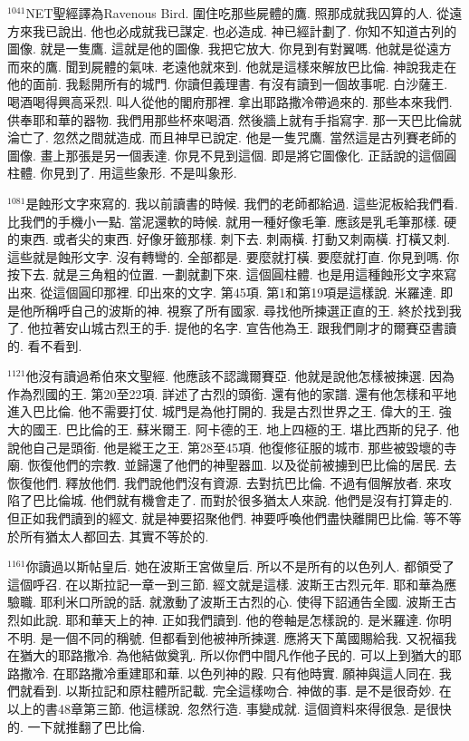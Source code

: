 \documentclass{book}
\begin{document}
$^{1041}$NET聖經譯為Ravenous Bird.
圍住吃那些屍體的鷹.
照那成就我囚算的人.
從遠方來我已說出.
他也必成就我已謀定.
也必造成.
神已經計劃了.
你知不知道古列的圖像.
就是一隻鷹.
這就是他的圖像.
我把它放大.
你見到有對翼嗎.
他就是從遠方而來的鷹.
聞到屍體的氣味.
老遠他就來到.
他就是這樣來解放巴比倫.
神說我走在他的面前.
我鬆開所有的城門.
你讀但義理書.
有沒有讀到一個故事呢.
白沙薩王.
喝酒喝得興高采烈.
叫人從他的閣府那裡.
拿出耶路撒冷帶過來的.
那些本來我們.
供奉耶和華的器物.
我們用那些杯來喝酒.
然後牆上就有手指寫字.
那一天巴比倫就淪亡了.
忽然之間就造成.
而且神早已說定.
他是一隻咒鷹.
當然這是古列賽老師的圖像.
畫上那張是另一個表達.
你見不見到這個.
即是將它圖像化.
正話說的這個圓柱體.
你見到了.
用這些象形.
不是叫象形.

$^{1081}$是蝕形文字來寫的.
我以前讀書的時候.
我們的老師都給過.
這些泥板給我們看.
比我們的手機小一點.
當泥還軟的時候.
就用一種好像毛筆.
應該是乳毛筆那樣.
硬的東西.
或者尖的東西.
好像牙籤那樣.
刺下去.
刺兩橫.
打動又刺兩橫.
打橫又刺.
這些就是蝕形文字.
沒有轉彎的.
全部都是.
要麼就打橫.
要麼就打直.
你見到嗎.
你按下去.
就是三角粗的位置.
一劃就劃下來.
這個圓柱體.
也是用這種蝕形文字來寫出來.
從這個圓印那裡.
印出來的文字.
第45項.
第1和第19項是這樣說.
米羅達.
即是他所稱呼自己的波斯的神.
視察了所有國家.
尋找他所揀選正直的王.
終於找到我了.
他拉著安山城古烈王的手.
提他的名字.
宣告他為王.
跟我們剛才的爾賽亞書讀的.
看不看到.

$^{1121}$他沒有讀過希伯來文聖經.
他應該不認識爾賽亞.
他就是說他怎樣被揀選.
因為作為烈國的王.
第20至22項.
詳述了古烈的頭銜.
還有他的家譜.
還有他怎樣和平地進入巴比倫.
他不需要打仗.
城門是為他打開的.
我是古烈世界之王.
偉大的王.
強大的國王.
巴比倫的王.
蘇米爾王.
阿卡德的王.
地上四極的王.
堪比西斯的兒子.
他說他自己是頭銜.
他是縱王之王.
第28至45項.
他復修征服的城市.
那些被毀壞的寺廟.
恢復他們的宗教.
並歸還了他們的神聖器皿.
以及從前被擄到巴比倫的居民.
去恢復他們.
釋放他們.
我們說他們沒有資源.
去對抗巴比倫.
不過有個解放者.
來攻陷了巴比倫城.
他們就有機會走了.
而對於很多猶太人來說.
他們是沒有打算走的.
但正如我們讀到的經文.
就是神要招聚他們.
神要呼喚他們盡快離開巴比倫.
等不等於所有猶太人都回去.
其實不等於的.

$^{1161}$你讀過以斯帖皇后.
她在波斯王宮做皇后.
所以不是所有的以色列人.
都領受了這個呼召.
在以斯拉記一章一到三節.
經文就是這樣.
波斯王古烈元年.
耶和華為應驗職.
耶利米口所說的話.
就激動了波斯王古烈的心.
使得下詔通告全國.
波斯王古烈如此說.
耶和華天上的神.
正如我們讀到.
他的卷軸是怎樣說的.
是米羅達.
你明不明.
是一個不同的稱號.
但都看到他被神所揀選.
應將天下萬國賜給我.
又祝福我在猶大的耶路撒冷.
為他結做奠乳.
所以你們中間凡作他子民的.
可以上到猶大的耶路撒冷.
在耶路撒冷重建耶和華.
以色列神的殿.
只有他時實.
願神與這人同在.
我們就看到.
以斯拉記和原柱體所記載.
完全這樣吻合.
神做的事.
是不是很奇妙.
在以上的書48章第三節.
他這樣說.
忽然行造.
事變成就.
這個資料來得很急.
是很快的.
一下就推翻了巴比倫.
\end{document}
